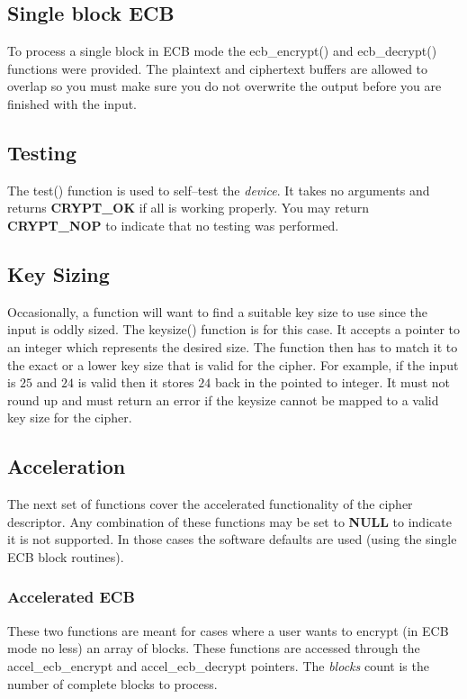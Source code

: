 \documentclass[synpaper]{book}
\begin{document}
\subsection{Single block ECB}
To process a single block in ECB mode the ecb\_encrypt() and ecb\_decrypt() functions were provided.  The plaintext and ciphertext buffers are allowed to overlap so you
must make sure you do not overwrite the output before you are finished with the input.

\subsection{Testing}
The test() function is used to self--test the \textit{device}.  It takes no arguments and returns \textbf{CRYPT\_OK} if all is working properly.  You may return
\textbf{CRYPT\_NOP} to indicate that no testing was performed.

\subsection{Key Sizing}
Occasionally, a function will want to find a suitable key size to use since the input is oddly sized.  The keysize() function is for this case.  It accepts a
pointer to an integer which represents the desired size.  The function then has to match it to the exact or a lower key size that is valid for the cipher.  For
example, if the input is $25$ and $24$ is valid then it stores $24$ back in the pointed to integer.  It must not round up and must return an error if the keysize
 cannot be mapped to a valid key size for the cipher.

\subsection{Acceleration}
The next set of functions cover the accelerated functionality of the cipher descriptor.  Any combination of these functions may be set to \textbf{NULL} to indicate
it is not supported.  In those cases the software defaults are used (using the single ECB block routines).

\subsubsection{Accelerated ECB}
These two functions are meant for cases where a user wants to encrypt (in ECB mode no less) an array of blocks.  These functions are accessed
through the accel\_ecb\_encrypt and accel\_ecb\_decrypt pointers.  The \textit{blocks} count is the number of complete blocks to process.
\end{document}
